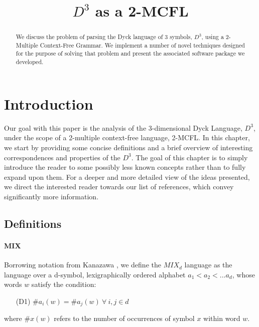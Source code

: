 \documentclass[nonatbib,numbers,10pt]{llncs}
\title{$D^3$ as a 2-MCFL}
\author{}
\institute{}
\begin{document}
\maketitle

\begin{abstract}
We discuss the problem of parsing the Dyck language of 3 symbols, $D^3$, using a 2-Multiple Context-Free Grammar. We implement a number of novel techniques designed for the purpose of solving that problem and present the associated software package we developed.
\end{abstract}



\section{Introduction}\label{sec1}
Our goal with this paper is the analysis of the 3-dimensional Dyck Language, $D^3$, under the scope of a 2-multiple context-free language, 2-MCFL. In this chapter, we start by providing some concise definitions and a brief overview of interesting correspondences and properties of the $D^3$. The goal of this chapter is to simply introduce the reader to some possibly less known concepts rather than to fully expand upon them. For a deeper and more detailed view of the ideas presented, we direct the interested reader towards our list of references, which convey significantly more information.
\subsection{Definitions}
\paragraph{MIX}
Borrowing notation from Kanazawa \cite{kanazawa}, we define the $MIX_d$ language as the language over a d-symbol, lexigraphically ordered alphabet $a_1 < a_2 < ... a_d$, whose words $w$ satisfy the condition:
\begin{itemize}
\item[(D1)]  $ \# a_i(w) = \# a_j(w) \ \forall \ i,j \in d $
\end{itemize}
where $ \#x(w)$ refers to the number of occurrences of symbol $x$ within word $w$.
\end{document}
